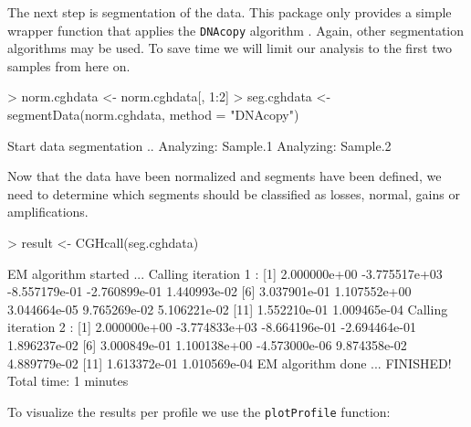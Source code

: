 \documentclass[11pt]{article}
\begin{document}
The next step is segmentation of the data. This package only provides a simple wrapper function that applies the {\tt DNAcopy} algorithm \citep{DNAcopy}. Again, other segmentation algorithms may be used. To save time we will limit our analysis to the first two samples from here on.

\begin{Schunk}
\begin{Sinput}
> norm.cghdata <- norm.cghdata[, 1:2]
> seg.cghdata <- segmentData(norm.cghdata, method = "DNAcopy")
\end{Sinput}
\begin{Soutput}
Start data segmentation .. 
Analyzing: Sample.1 
Analyzing: Sample.2 
\end{Soutput}
\end{Schunk}

Now that the data have been normalized and segments have been defined, we need to determine which segments should be classified as losses, normal, gains or amplifications.

\begin{Schunk}
\begin{Sinput}
> result <- CGHcall(seg.cghdata)
\end{Sinput}
\begin{Soutput}
EM algorithm started ... 
Calling iteration 1 :
 [1]  2.000000e+00 -3.775517e+03 -8.557179e-01 -2.760899e-01  1.440993e-02
 [6]  3.037901e-01  1.107552e+00  3.044664e-05  9.765269e-02  5.106221e-02
[11]  1.552210e-01  1.009465e-04
Calling iteration 2 :
 [1]  2.000000e+00 -3.774833e+03 -8.664196e-01 -2.694464e-01  1.896237e-02
 [6]  3.000849e-01  1.100138e+00 -4.573000e-06  9.874358e-02  4.889779e-02
[11]  1.613372e-01  1.010569e-04
EM algorithm done ...
FINISHED!
Total time: 1 minutes
\end{Soutput}
\end{Schunk}

\pagebreak
\noindent
To visualize the results per profile we use the {\tt plotProfile} function:
\end{document}
